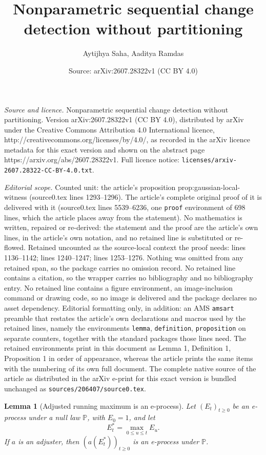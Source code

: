 \documentclass[10pt,a4paper]{amsart}
\title{Nonparametric sequential change detection without partitioning}
\author{Aytijhya Saha, Aaditya Ramdas}
\date{Source: arXiv:2607.28322v1 (CC BY 4.0)}
\newtheorem{lemma}{Lemma}
\begin{document}
\maketitle

\noindent\emph{Source and licence.} Nonparametric sequential change detection without partitioning. Version arXiv:2607.28322v1 (CC BY 4.0), distributed by arXiv under the Creative Commons Attribution 4.0 International licence, http://creativecommons.org/licenses/by/4.0/, as recorded in the arXiv licence metadata for this exact version and shown on the abstract page https://arxiv.org/abs/2607.28322v1. Full licence notice: \texttt{licenses/arxiv-2607.28322-CC-BY-4.0.txt}.\par\smallskip

\noindent\textit{Editorial scope.} Counted unit: the article's proposition prop:gaussian-local-witness (source0.tex lines 1293--1296). The article's complete original proof of it is delivered with it (source0.tex lines 5539--6236, one \texttt{proof} environment of 698 lines, which the article places away from the statement). No mathematics is written, repaired or re-derived: the statement and the proof are the article's own lines, in the article's own notation, and no retained line is substituted or re-flowed.  Retained uncounted as the source-local context the proof needs: lines 1136--1142; lines 1240--1247; lines 1253--1276.  Nothing was omitted from any retained span, so the package carries no omission record.  No retained line contains a citation, so the wrapper carries no bibliography and no bibliography entry.  No retained line contains a figure environment, an image-inclusion command or drawing code, so no image is delivered and the package declares no asset dependency.  Editorial formatting only, in addition: an AMS \texttt{amsart} preamble that restates the article's own declarations and macros used by the retained lines, namely the environments \texttt{lemma}, \texttt{definition}, \texttt{proposition} on separate counters, together with the standard packages those lines need.  The retained environments print in this document as Lemma 1, Definition 1, Proposition 1 in order of appearance, whereas the article prints the same items with the numbering of its own full document.  The complete native source of the article as distributed in the arXiv e-print for this exact version is bundled unchanged as \texttt{sources/206407/source0.tex}.
\begin{lemma}[Adjusted running maximum is an e-process]\label{lem:adjusted-max}
Let $(E_t)_{t\ge0}$ be an e-process under a null law $\mathbb P$, with $E_0=1$, and let
\[
  E_t^*=\max_{0\le u\le t}E_u.
\]
If $a$ is an adjuster, then $(a(E_t^*))_{t\ge0}$ is an e-process under $\mathbb P$.
\end{lemma}
\end{document}
